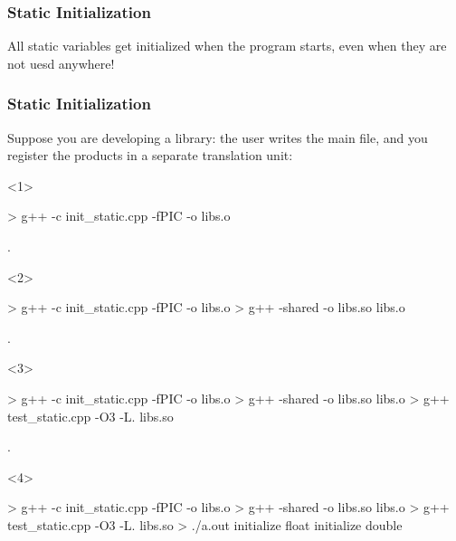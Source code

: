 \documentclass[aspectratio=43]{beamer}
\begin{document}
\begin{frame}[fragile]\frametitle{Static Initialization}
  All static variables get initialized when the program starts, even when they are not uesd anywhere!
\end{frame}

\begin{frame}[fragile]\frametitle{Static Initialization}
  Suppose you are developing a library: the user writes the main file, and you register the products in a separate translation unit:

  \begin{onlyenv}<1>
\begin{Shelllisting}{}
> g++ -c init_static.cpp -fPIC -o libs.o




.
\end{Shelllisting}
  \end{onlyenv}
  \begin{onlyenv}<2>
\begin{Shelllisting}{}
> g++ -c init_static.cpp -fPIC -o libs.o
> g++ -shared -o libs.so libs.o



.
\end{Shelllisting}
  \end{onlyenv}
  \begin{onlyenv}<3>
\begin{Shelllisting}{}
> g++ -c init_static.cpp -fPIC -o libs.o
> g++ -shared -o libs.so libs.o
> g++ test_static.cpp -O3 -L. libs.so


.
\end{Shelllisting}
  \end{onlyenv}
  \begin{onlyenv}<4>
\begin{Shelllisting}{}
> g++ -c init_static.cpp -fPIC -o libs.o
> g++ -shared -o libs.so libs.o
> g++ test_static.cpp -O3 -L. libs.so
> ./a.out
initialize float
initialize double
\end{Shelllisting}
  \end{onlyenv}
\end{frame}
\end{document}

